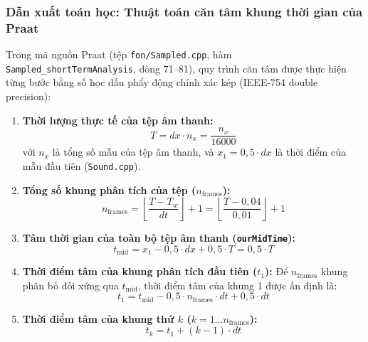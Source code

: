 \subsubsection*{Dẫn xuất toán học: Thuật toán căn tâm khung thời gian của Praat}
Trong mã nguồn Praat (tệp \texttt{fon/Sampled.cpp}, hàm \texttt{Sampled\_shortTermAnalysis}, dòng 71--81), quy trình căn tâm được thực hiện từng bước bằng số học dấu phẩy động chính xác kép (IEEE-754 double precision):
\begin{enumerate}[leftmargin=1.5em, itemsep=2pt]
    \item \textbf{Thời lượng thực tế của tệp âm thanh:}
    \begin{equation}
    T = dx \cdot n_x = \frac{n_x}{16000}
    \end{equation}
    với $n_x$ là tổng số mẫu của tệp âm thanh, và $x_1 = 0{,}5 \cdot dx$ là thời điểm của mẫu đầu tiên (\texttt{Sound.cpp}).
    
    \item \textbf{Tổng số khung phân tích của tệp ($n_{\text{frames}}$):}
    \begin{equation}
    n_{\text{frames}} = \left\lfloor \frac{T - T_w}{dt} \right\rfloor + 1 = \left\lfloor \frac{T - 0{,}04}{0{,}01} \right\rfloor + 1
    \end{equation}
    
    \item \textbf{Tâm thời gian của toàn bộ tệp âm thanh (\texttt{ourMidTime}):}
    \begin{equation}
    t_{\text{mid}} = x_1 - 0{,}5 \cdot dx + 0{,}5 \cdot T = 0{,}5 \cdot T
    \end{equation}
    
    \item \textbf{Thời điểm tâm của khung phân tích đầu tiên ($t_1$):}
    Để $n_{\text{frames}}$ khung phân bố đối xứng qua $t_{\text{mid}}$, thời điểm tâm của khung 1 được ấn định là:
    \begin{equation}
    t_1 = t_{\text{mid}} - 0{,}5 \cdot n_{\text{frames}} \cdot dt + 0{,}5 \cdot dt
    \end{equation}
    
    \item \textbf{Thời điểm tâm của khung thứ $k$ ($k = 1 \dots n_{\text{frames}}$):}
    \begin{equation}
    t_k = t_1 + (k - 1) \cdot dt
    \end{equation}
\end{enumerate}

